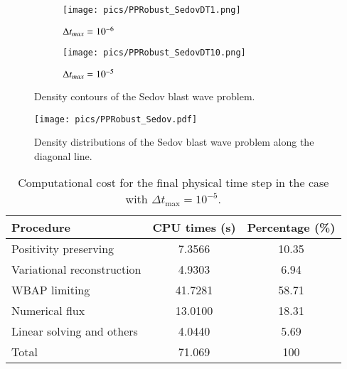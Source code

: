 \begin{figure}[htbp]
    \centering
    \begin{subfigure}{0.5\textwidth}
        \texttt{[image: pics/PPRobust\_SedovDT1.png]}
        \caption[]{$\mathrm\Delta t_{max}=10^{-6}$}
    \end{subfigure}\hfill
    \begin{subfigure}{0.5\textwidth}
        \texttt{[image: pics/PPRobust\_SedovDT10.png]}
        \caption[]{$\mathrm\Delta t_{max}=10^{-5}$}
    \end{subfigure}
    \caption{Density contours of the Sedov blast wave problem.}
    \label{fig:sedov}
\end{figure}

\begin{figure}[htbp]
    \centering
    \texttt{[image: pics/PPRobust\_Sedov.pdf]}
    \caption{Density distributions of the Sedov blast wave problem along the diagonal line.}
    \label{fig:sedovLine}
\end{figure}

\begin{table}[htbp!]
    \centering
    \caption{Computational cost for the final physical time step in the case with $\Delta t_{\text{max}} = 10^{-5}$.}
    \label{tab:cpu-time-cost}
    \setlength{\tabcolsep}{12.5pt} %
    \renewcommand{\arraystretch}{1.2}
    \begin{tabular}{l c c}
        \toprule
        Procedure & CPU times (s) & Percentage (\%) \\
        \midrule
        Positivity preserving & 7.3566 & 10.35\\
        Variational reconstruction & 4.9303 & 6.94\\
        WBAP limiting & 41.7281 & 58.71\\
        Numerical flux & 13.0100 & 18.31\\
        Linear solving and others &  4.0440 & 5.69\\
        \midrule
        {Total} & 71.069 & 100 \\
    \bottomrule
    \end{tabular}
\end{table}

